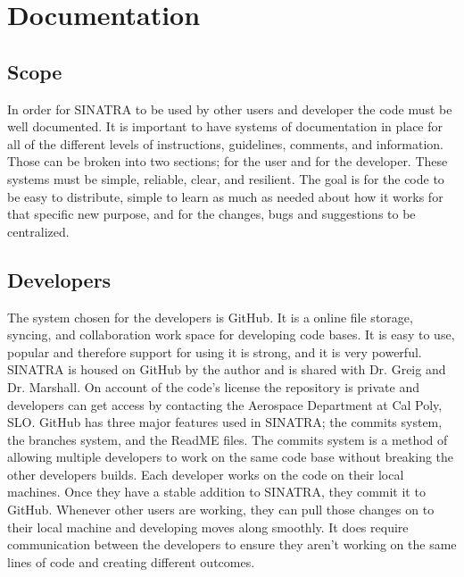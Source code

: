 \chapter{Documentation}
\section{Scope}
In order for SINATRA to be used by other users and developer the code must be well documented. It is important to have systems of documentation in place for all of the different levels of instructions, guidelines, comments, and information. Those can be broken into two sections; for the user and for the developer. These systems must be simple, reliable, clear, and resilient. The goal is for the code to be easy to distribute, simple to learn as much as needed about how it works for that specific new purpose, and for the changes, bugs and suggestions to be centralized.
\section{Developers}
The system chosen for the developers is GitHub. It is a online file storage, syncing, and collaboration work space for developing code bases. It is easy to use, popular and therefore support for using it is strong, and it is very powerful. SINATRA is housed on GitHub by the author and is shared with Dr. Greig and Dr. Marshall. On account of the code's license the repository is private and developers can get access by contacting the Aerospace Department at Cal Poly, SLO. GitHub has three major features used in SINATRA; the commits system, the branches system, and the ReadME files. The commits system is a method of allowing multiple developers to work on the same code base without breaking the other developers builds. Each developer works on the code on their local machines. Once they have a stable addition to SINATRA, they commit it to GitHub. Whenever other users are working, they can pull those changes on to their local machine and developing moves along smoothly. It does require communication between the developers to ensure they aren't working on the same lines of code and creating different outcomes. 